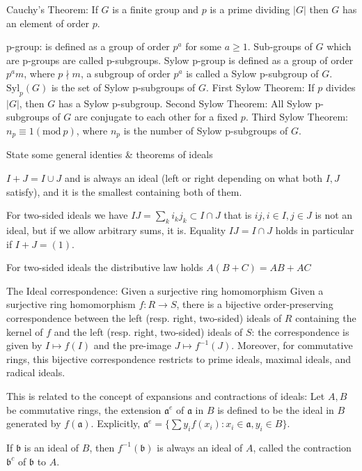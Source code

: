 Cauchy's Theorem: If \(G\) is a finite group and \(p\) is a prime dividing \(|G|\) then \(G\) has an element of order \(p\).

p-group: is defined as a group of order \(p^a\) for some \(a \geq 1\). Sub-groups of \(G\) which are p-groups are called p-subgroups.
Sylow p-group is defined as a group of order \(p^am\), where \(p \nmid m\), a subgroup of order \(p^a\) is called a Sylow p-subgroup of \(G\). \(\text{Syl}_p(G)\) is the set of Sylow p-subgroups of \(G\).
First Sylow Theorem:
If \(p\) divides \(|G|\), then \(G\) has a Sylow p-subgroup.
Second Sylow Theorem:
All Sylow p-subgroups of \(G\) are conjugate to each other for a fixed \(p\).
Third Sylow Theorem:
\(n_p \equiv 1 (\text{mod}\ p)\), where \(n_p\) is the number of Sylow p-subgroups of \(G\).


State some general identies & theorems of ideals

\( I + J = I \cup J \) and is always an ideal (left or right depending on what both \( I, J \) satisfy),
and it is the smallest containing both of them.

For two-sided ideals we have
\( IJ = \sum_{k} i_k j_k \subset I \cap J\) that is \( ij, i \in I, j \in J \) is not an ideal, but if we allow arbitrary
sums, it is. Equality \( IJ = I \cap J \) holds in particular if \( I + J = (1) \).

For two-sided ideals the distributive law holds \( A(B + C) = AB + AC \)

The Ideal correspondence: 
Given a surjective ring homomorphism
Given a surjective ring homomorphism \( f: R \to S \), there is a bijective order-preserving correspondence between the left (resp. right, two-sided) ideals of \( R \) containing the kernel of \( f \) and the left (resp. right, two-sided) ideals of \( S \): the correspondence is given by \( I \mapsto f(I) \) and the pre-image \( J \mapsto f^{-1}(J) \). Moreover, for commutative rings, this bijective correspondence restricts to prime ideals, maximal ideals, and radical ideals.

This is related to the concept of expansions and contractions of ideals:
Let \(A, B\) be commutative rings,
the extension \( \mathfrak{a}^e \) of \( \mathfrak{a} \) in \( B \) is defined to be the ideal in \( B \) generated by \( f(\mathfrak{a}) \). Explicitly,
\( \mathfrak{a}^e = \Big\{ \sum y_if(x_i) : x_i \in \mathfrak{a}, y_i \in B \Big\} \).

If \( \mathfrak{b} \) is an ideal of \( B \), then \( f^{-1}(\mathfrak{b}) \) is always an ideal of \( A \), called the contraction \( \mathfrak{b}^c \) of \( \mathfrak{b} \) to \( A \).

